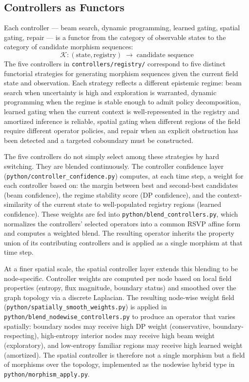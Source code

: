 \documentclass[11pt, oneside]{article}
\begin{document}
\subsection{Controllers as Functors}

Each controller --- beam search, dynamic programming, learned gating, spatial gating,
repair --- is a functor from the category of observable states to the category of
candidate morphism sequences:
\[
\mathcal{K} : (\text{state}, \text{registry}) \;\longrightarrow\; \text{candidate sequence}
\]
The five controllers in \texttt{controllers/registry/} correspond to five distinct
functorial strategies for generating morphism sequences given the current field state and
observation. Each strategy reflects a different epistemic regime: beam search when
uncertainty is high and exploration is warranted, dynamic programming when the regime is
stable enough to admit policy decomposition, learned gating when the current context is
well-represented in the registry and amortized inference is reliable, spatial gating when
different regions of the field require different operator policies, and repair when an
explicit obstruction has been detected and a targeted coboundary must be constructed.

The five controllers do not simply select among these strategies by hard switching.
They are blended continuously. The controller confidence layer
(\texttt{python/controller\_confidence.py}) computes, at each time step, a weight for
each controller based on: the margin between best and second-best candidates (beam
confidence), the regime stability score (DP confidence), and the context-similarity of
the current state to well-populated registry regions (learned confidence). These weights
are fed into \texttt{python/blend\_controllers.py}, which normalizes the controllers'
selected operators into a common RSVP affine form and computes a weighted blend. The
resulting operator inherits the property union of its contributing controllers and is
applied as a single morphism at that time step.

At a finer spatial scale, the spatial controller layer extends this blending to be
node-specific. Controller weights are computed per node based on local field properties
(entropy, flux magnitude, boundary status) and smoothed over the graph topology via a
discrete Laplacian. The resulting node-wise weight field
(\texttt{python/spatially\_smooth\_weights.py}) is applied in
\texttt{python/blend\_nodewise\_controllers.py} to produce an operator that varies
spatially: boundary nodes may receive high DP weight (conservative, boundary-respecting),
high-entropy interior nodes may receive high beam weight (exploratory), and
low-entropy familiar regions may receive high learned weight (amortized). The spatial
controller is therefore not a single morphism but a field of morphisms over the topology,
implemented as the nodewise hybrid type in \texttt{python/morphism\_apply.py}.
\end{document}
